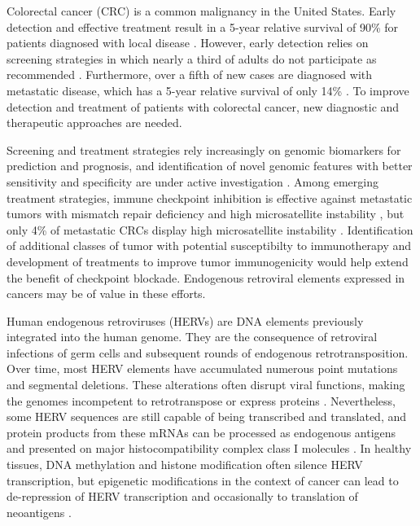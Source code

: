 Colorectal cancer (CRC) is a common malignancy in the United States.
Early detection and effective treatment result in a 5-year relative survival of 90\% for patients diagnosed with local disease \citep{SEER2020}.
However, early detection relies on screening strategies in which nearly a third of adults do not participate as recommended \citep{CDC2019}.
Furthermore, over a fifth of new cases are diagnosed with metastatic disease, which has a 5-year relative survival of only 14\% \citep{SEER2020}.
To improve detection and treatment of patients with colorectal cancer, new diagnostic and therapeutic approaches are needed.

Screening and treatment strategies rely increasingly on genomic biomarkers for prediction and prognosis, and identification of novel genomic features with better sensitivity and specificity are under active investigation \citep{Imperiale2014, Sveen2020}.
Among emerging treatment strategies, immune checkpoint inhibition is effective against metastatic tumors with mismatch repair deficiency and high microsatellite instability \citep{Le2015, Overman2018}, but only 4\% of metastatic CRCs display high microsatellite instability \citep{Ganesh2019}.
Identification of additional classes of tumor with potential susceptibilty to immunotherapy and development of treatments to improve tumor immunogenicity would help extend the benefit of checkpoint blockade.
Endogenous retroviral elements expressed in cancers may be of value in these efforts.

Human endogenous retroviruses (HERVs) are DNA elements previously integrated into the human genome.
They are the consequence of retroviral infections of germ cells and subsequent rounds of endogenous retrotransposition.
Over time, most HERV elements have accumulated numerous point mutations and segmental deletions.
These alterations often disrupt viral functions, making the genomes incompetent to retrotranspose or express proteins \citep{Babaian2016}.
Nevertheless, some HERV sequences are still capable of being transcribed and translated, and protein products from these mRNAs can be processed as endogenous antigens and presented on major histocompatibility complex class I molecules \citep{Boller1997, Mullins2012, Rooney2015}.
In healthy tissues, DNA methylation and histone modification often silence HERV transcription, but epigenetic modifications in the context of cancer can lead to de-repression of HERV transcription and occasionally to translation of neoantigens \citep{Babaian2016, Menendez2004, Wiesner2015}.

